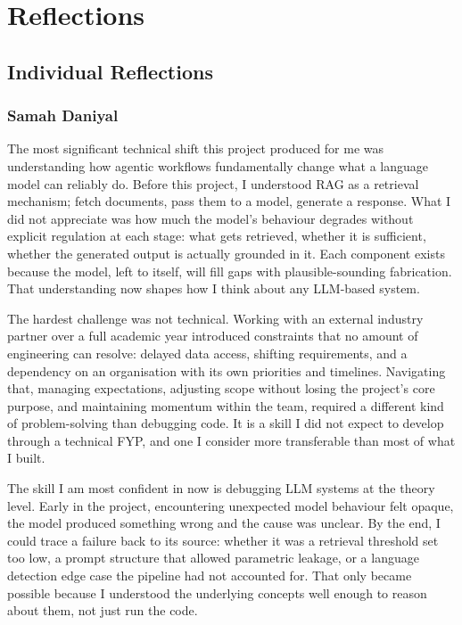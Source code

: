 \section{Reflections}

\subsection{Individual Reflections}

\subsubsection*{Samah Daniyal}

The most significant technical shift this project produced for me was 
understanding how agentic workflows fundamentally change what a language model 
can reliably do. Before this project, I understood RAG as a retrieval mechanism; 
fetch documents, pass them to a model, generate a response. What I did not 
appreciate was how much the model's behaviour degrades without explicit 
regulation at each stage: what gets retrieved, whether it is sufficient, whether 
the generated output is actually grounded in it. Each component exists because the model, 
left to itself, will fill gaps with plausible-sounding fabrication. That 
understanding now shapes how I think about any LLM-based system.

The hardest challenge was not technical. Working with an external industry 
partner over a full academic year introduced constraints that no amount of 
engineering can resolve: delayed data access, shifting requirements, and a 
dependency on an organisation with its own priorities and timelines. Navigating 
that, managing expectations, adjusting scope without losing the project's core 
purpose, and maintaining momentum within the team, required a different kind of 
problem-solving than debugging code. It is a skill I did not expect to develop 
through a technical FYP, and one I consider more transferable than most of what 
I built.

The skill I am most confident in now is debugging LLM systems at the theory 
level. Early in the project, encountering unexpected model behaviour felt 
opaque, the model produced something wrong and the cause was unclear. By the 
end, I could trace a failure back to its source: whether it was a retrieval 
threshold set too low, a prompt structure that allowed parametric leakage, or a 
language detection edge case the pipeline had not accounted for. That only 
became possible because I understood the underlying concepts well enough to 
reason about them, not just run the code.

